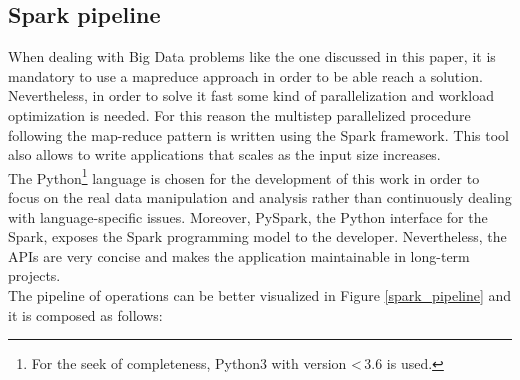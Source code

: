 \documentclass{sig-alternate-05-2015}
\begin{document}
\subsection{Spark pipeline}
When dealing with Big Data problems like the one discussed in this paper, it is mandatory to use a map\-reduce approach in order to be able reach a solution. Nevertheless, in order to solve it fast some kind of parallelization and workload optimization is needed. For this reason the multi\-step parallelized procedure following the map-reduce pattern is written using the Spark framework. This tool also allows to write applications that scales as the input size increases.\\
The Python\footnote{For the seek of completeness, Python3 with version \textless\,3.6 is used.} language is chosen for the development of this work in order to focus on the real data manipulation and analysis rather than continuously dealing with language-specific issues. Moreover, PySpark, the Python interface for the Spark, exposes the Spark programming model to the developer. Nevertheless, the APIs are very concise and makes the application maintainable in long-term projects.\\
The pipeline of operations can be better visualized in Figure \ref{spark_pipeline} and it is composed as follows:
\end{document}
